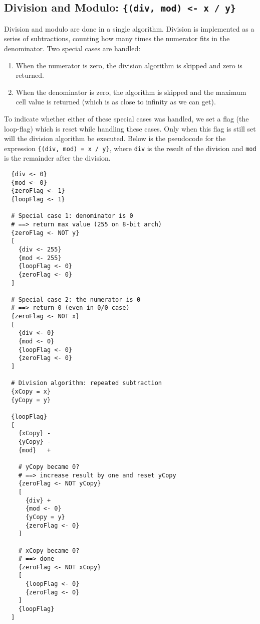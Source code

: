 \tocless\subsection{Division and Modulo: \texttt{\{(div, mod) <- x / y\}}}
Division and modulo are done in a single algorithm. Division is implemented as a series of subtractions, counting how many times the numerator fits in the denominator. Two special cases are handled:
\begin{enumerate}
\item When the numerator is zero, the division algorithm is skipped and zero is returned.
\item When the denominator is zero, the algorithm is skipped and the maximum cell value is returned (which is as close to infinity as we can get).
\end{enumerate}
To indicate whether either of these special cases was handled, we set a flag (the loop-flag) which is reset while handling these cases. Only when this flag is still set will the division algorithm be executed. Below is the pseudocode for the expression \texttt{\{(div, mod) = x / y\}}, where \texttt{div} is the result of the division and \texttt{mod} is the remainder after the division.

\begin{lstlisting}
  {div <- 0}
  {mod <- 0}
  {zeroFlag <- 1}  
  {loopFlag <- 1}

  # Special case 1: denominator is 0
  # ==> return max value (255 on 8-bit arch)
  {zeroFlag <- NOT y}
  [
    {div <- 255}
    {mod <- 255}
    {loopFlag <- 0}
    {zeroFlag <- 0}
  ]

  # Special case 2: the numerator is 0
  # ==> return 0 (even in 0/0 case)
  {zeroFlag <- NOT x}
  [
    {div <- 0}
    {mod <- 0}
    {loopFlag <- 0}
    {zeroFlag <- 0}
  ]

  # Division algorithm: repeated subtraction
  {xCopy = x}
  {yCopy = y}

  {loopFlag}
  [
    {xCopy} -
    {yCopy} -
    {mod}   +

    # yCopy became 0?
    # ==> increase result by one and reset yCopy
    {zeroFlag <- NOT yCopy}
    [
      {div} +
      {mod <- 0}
      {yCopy = y}
      {zeroFlag <- 0}
    ]

    # xCopy became 0?
    # ==> done
    {zeroFlag <- NOT xCopy}
    [
      {loopFlag <- 0}
      {zeroFlag <- 0}
    ]
    {loopFlag}
  ]    
\end{lstlisting}

    
